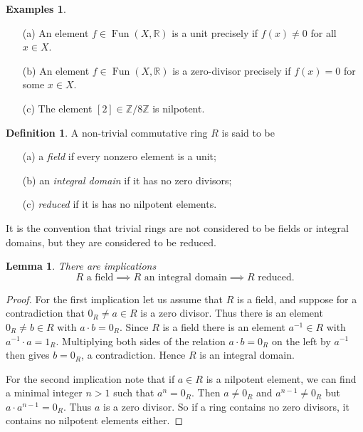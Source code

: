 \documentclass [12pt,oneside,a4paper,mathscr]{amsart}
\newtheorem{lemma}[thm]{Lemma}
\theoremstyle{definition}
\newtheorem{defn}[thm]{Definition}
\newtheorem{examples}[thm]{Examples}
\newcommand{\R}{\mathbb{R}}
\newcommand{\Z}{\mathbb Z}
\newcommand{\Fun}{\operatorname{Fun}}
\begin{document}
\begin{examples}
\begin{itemize}
\item[(a)] An element $f\in \Fun(X,\R)$ is a unit precisely if $f(x)\neq 0$ for all $x\in X$.
\smallskip
\item[(b)] An element $f\in \Fun(X,\R)$ is a zero-divisor precisely if $f(x)=0$ for some $x\in X$.
\smallskip
\item[(c)] The element $[2]\in \Z/8\Z$ is nilpotent.
\end{itemize}
\end{examples}





\begin{defn}
A non-trivial commutative ring $R$ is said to be
\begin{itemize}
\item[(a)]a \emph{field} if every nonzero element is a unit;
\smallskip
\item[(b)]an \emph{integral domain} if it has no zero divisors;
\smallskip
\item[(c)] \emph{reduced} if it is has no nilpotent elements.
\end{itemize}
\end{defn}

It is the convention that trivial rings are not considered to be fields or  integral domains, but they are considered to be reduced. 


\begin{lemma}
\label{imp}
There 
are implications
\[R \text{ a field} \implies R \text{ an integral domain} \implies R \text{ reduced}.\]
\end{lemma}

\begin{proof}
For the first implication let us assume that $R$ is a field, and suppose for a contradiction  that  $0_R\neq a\in R$ is a zero divisor. Thus there is an element $0_R\neq b\in R$ with $a\cdot b=0_R$. Since $R$ is a field there is an element $a^{-1}\in R$ with $a^{-1}\cdot a=1_R$. Multiplying both sides of the relation $a\cdot b=0_R$ on the left by $a^{-1}$ then gives $ b = 0_R$, a contradiction. Hence $R$ is an integral domain.

For the second implication note that if $a\in R$ is a nilpotent element, we can find a minimal integer $n>1$ such that $a^n=0_R$. Then $a\neq 0_R$ and $a^{n-1}\neq 0_R$ but $a\cdot a^{n-1}=0_R$. Thus $a$ is a zero divisor. So if a ring  contains no zero divisors, it contains no nilpotent elements either.
\end{proof}
\end{document}
